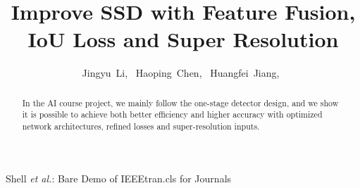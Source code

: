 \documentclass[journal,conference]{IEEEtran}
\begin{document}
\newcommand{\code}[1]{\colorbox[rgb]{0.95,0.95,0.95}{#1}}

%
\title{Improve SSD with Feature Fusion, \\IoU Loss and Super Resolution}
%
%
%

\author{
  Jingyu~Li,~
  Haoping~Chen,~
  Huangfei~Jiang,~
}

%
{Shell \MakeLowercase{\textit{et al.}}: Bare Demo of IEEEtran.cls for Journals}
%


\maketitle

\begin{abstract}
  In the AI course project, we mainly follow the one-stage detector design, and we show it is possible to achieve both better efficiency and higher accuracy with optimized network architectures, refined losses and super-resolution inputs.
\end{abstract}
\end{document}
